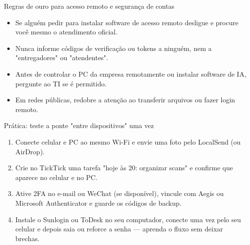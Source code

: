 \begin{tcbwarn}{Regras de ouro para acesso remoto e segurança de contas}
\begin{itemize}
  \item Se alguém pedir para instalar software de acesso remoto desligue e procure você mesmo o atendimento oficial.
  \item Nunca informe códigos de verificação ou tokens a ninguém, nem a "entregadores" ou "atendentes".
  \item Antes de controlar o PC da empresa remotamente ou instalar software de IA, pergunte ao TI se é permitido.
  \item Em redes públicas, redobre a atenção ao transferir arquivos ou fazer login remoto.
\end{itemize}

\end{tcbwarn}

\begin{tcbpractice}{Prática: teste a ponte "entre dispositivos" uma vez}
\begin{enumerate}
  \item Conecte celular e PC ao mesmo Wi-Fi e envie uma foto pelo LocalSend (ou AirDrop).
  \item Crie no TickTick uma tarefa "hoje às 20: organizar scans" e confirme que aparece no celular e no PC.
  \item Ative 2FA no e-mail ou WeChat (se disponível), vincule com Aegis ou Microsoft Authenticator e guarde os códigos de backup.
  \item Instale o Sunlogin ou ToDesk no seu computador, conecte uma vez pelo seu celular e depois saia ou reforce a senha — aprenda o fluxo sem deixar brechas.
\end{enumerate}

\end{tcbpractice}
